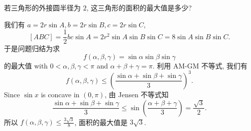 \begin{prob}
\label{prob:prob-1}
若三角形的外接圆半径为 $2$,
这三角形的面积的最大值是多少?
\end{prob}

\begin{soln}
我们有 $a = 2r\sin A, b = 2r\sin B, c = 2r\sin C$,
\[
[ABC] = \frac{1}{2}bc\sin A
= 2r^2\sin A \sin B \sin C
= 8 \sin A \sin B \sin C.
\]
于是问题归结为求
\begin{equation}
\label{eq:prob-1-eq-1}
f(\alpha,\beta,\gamma)
= \sin\alpha\sin\beta\sin\gamma
\end{equation}
的最大值 with $0 < \alpha,\beta,\gamma < \pi$
and $\alpha + \beta + \gamma = \pi$.
利用 AM-GM 不等式, 我们有
\[
f(\alpha,\beta,\gamma)
\le
\left(\frac{\sin\alpha + \sin\beta + \sin\gamma}{3}\right)^3.
\]
Since $\sin x$ is concave in $(0,\pi)$, 由 Jensen 不等式知
\[
\frac{\sin\alpha + \sin\beta + \sin\gamma}{3}
\le
\sin\left(\frac{\alpha + \beta + \gamma}{3}\right)
=
\frac{\sqrt{3}}{2}.
\]
所以 $f(\alpha,\beta,\gamma) \le \frac{3\sqrt{3}}{8}$,
面积的最大值是 $\boxed{3\sqrt{3}}$.
\end{soln}
